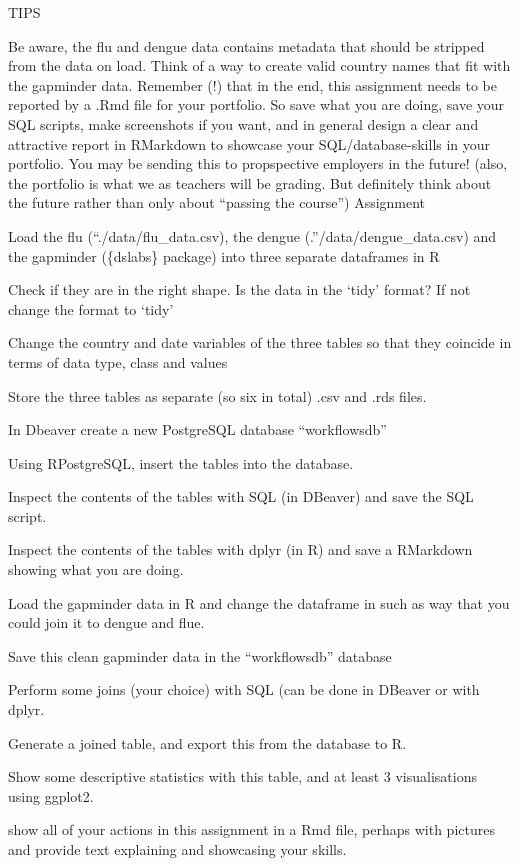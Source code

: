 \documentclass[
]{book}
\begin{document}
TIPS

Be aware, the flu and dengue data contains metadata that should be stripped from the data on load.
Think of a way to create valid country names that fit with the gapminder data.
Remember (!) that in the end, this assignment needs to be reported by a .Rmd file for your portfolio. So save what you are doing, save your SQL scripts, make screenshots if you want, and in general design a clear and attractive report in RMarkdown to showcase your SQL/database-skills in your portfolio. You may be sending this to propspective employers in the future! (also, the portfolio is what we as teachers will be grading. But definitely think about the future rather than only about ``passing the course'')
Assignment

Load the flu (``./data/flu\_data.csv), the dengue (.''/data/dengue\_data.csv) and the gapminder (\{dslabs\} package) into three separate dataframes in R

Check if they are in the right shape. Is the data in the `tidy' format? If not change the format to `tidy'

Change the country and date variables of the three tables so that they coincide in terms of data type, class and values

Store the three tables as separate (so six in total) .csv and .rds files.

In Dbeaver create a new PostgreSQL database ``workflowsdb''

Using RPostgreSQL, insert the tables into the database.

Inspect the contents of the tables with SQL (in DBeaver) and save the SQL script.

Inspect the contents of the tables with dplyr (in R) and save a RMarkdown showing what you are doing.

Load the gapminder data in R and change the dataframe in such as way that you could join it to dengue and flue.

Save this clean gapminder data in the ``workflowsdb'' database

Perform some joins (your choice) with SQL (can be done in DBeaver or with dplyr.

Generate a joined table, and export this from the database to R.

Show some descriptive statistics with this table, and at least 3 visualisations using ggplot2.

show all of your actions in this assignment in a Rmd file, perhaps with pictures and provide text explaining and showcasing your skills.
\end{document}
